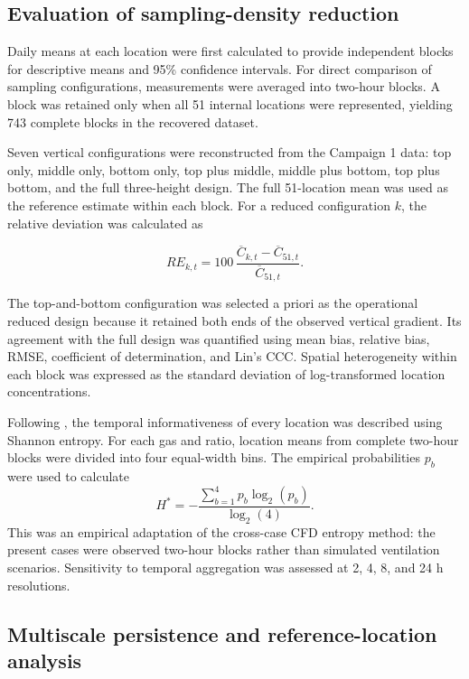 \documentclass[12pt,a4paper]{article}
\begin{document}
\subsection{Evaluation of sampling-density reduction}

Daily means at each location were first calculated to provide independent
blocks for descriptive means and 95\% confidence intervals. For direct
comparison of sampling configurations, measurements were averaged into
two-hour blocks. A block was retained only when all 51 internal locations
were represented, yielding 743 complete blocks in the recovered dataset.

Seven vertical configurations were reconstructed from the Campaign 1 data:
top only, middle only, bottom only, top plus middle, middle plus bottom, top
plus bottom, and the full three-height design. The full 51-location mean was
used as the reference estimate within each block. For a reduced configuration
\(k\), the relative deviation was calculated as

\begin{equation}
RE_{k,t}=100\,
\frac{\overline{C}_{k,t}-\overline{C}_{51,t}}
     {\overline{C}_{51,t}}.
\end{equation}

The top-and-bottom configuration was selected a priori as the operational
reduced design because it retained both ends of the observed vertical
gradient. Its agreement with the full design was quantified using mean bias,
relative bias, RMSE, coefficient of determination, and Lin's CCC. Spatial
heterogeneity within each block was expressed as the standard deviation of
log-transformed location concentrations.

Following \citet{Chen2026}, the temporal informativeness of every location was
described using Shannon entropy. For each gas and ratio, location means from
complete two-hour blocks were divided into four equal-width bins. The
empirical probabilities \(p_b\) were used to calculate
\begin{equation}
H^*=-\frac{\sum_{b=1}^{4}p_b\log_2(p_b)}{\log_2(4)}.
\end{equation}
This was an empirical adaptation of the cross-case CFD entropy method: the
present cases were observed two-hour blocks rather than simulated ventilation
scenarios. Sensitivity to temporal aggregation was assessed at 2, 4, 8, and
24 h resolutions.

\subsection{Multiscale persistence and reference-location analysis}
\end{document}
